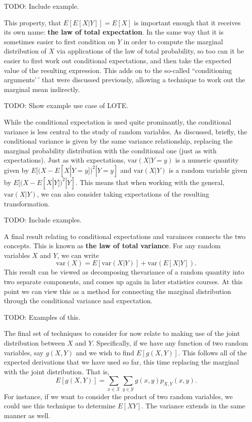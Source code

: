 \documentclass[
  letterpaper,
  DIV=11,
  numbers=noendperiod]{scrreprt}
\begin{document}
TODO: Include example.

This property, that \(E[E[X|Y]] = E[X]\) is important enough that it
receives its own name: \textbf{the law of total expectation}. In the
same way that it is sometimes easier to first condition on \(Y\) in
order to compute the marginal distribution of \(X\) via applications of
the law of total probability, so too can it be easier to first work out
conditional expectations, and then take the expected value of the
resulting expression. This adds on to the so-called ``conditioning
arguments'\,' that were discussed previously, allowing a technique to
work out the marginal mean indirectly.

TODO: Show example use case of LOTE.

While the conditional expectation is used quite prominantly, the
conditional variance is less central to the study of random variables.
As discussed, briefly, the conditional variance is given by the same
variance relationship, replacing the marginal probability distribution
with the conditional one (just as with expectations). Just as with
expectations, \(\text{var}(X|Y=y)\) is a numeric quantity given by
\(E[(X-E[X|Y=y])^2|Y=y]\) and \(\text{var}(X|Y)\) is a random variable
given by \(E[(X-E[X|Y])^2|Y]\). This means that when working with the
general, \(\text{var}(X|Y)\), we can also consider taking expectations
of the resulting transformation.

TODO: Include examples.

A final result relating to conditional expectations and varainces
connects the two concepts. This is known as \textbf{the law of total
variance}. For any random variables \(X\) and \(Y\), we can write
\[\text{var}(X) = E[\text{var}(X|Y)] + \text{var}(E[X|Y]).\] This result
can be viewed as decomposing thevariance of a random quantity into two
separate components, and comes up again in later statistics courses. At
this point we can view this as a method for connecting the marginal
distribution through the conditional variance nad expectation.

TODO: Examples of this.

The final set of techniques to consider for now relate to making use of
the joint distribution between \(X\) and \(Y\). Specifically, if we have
any function of two random variables, say \(g(X,Y)\) and we wish to find
\(E[g(X,Y)]\). This follows all of the expected derivations that we have
used so far, this time replacing the marginal with the joint
distribution. That is,
\[E[g(X,Y)] = \sum_{x\in\mathcal{X}}\sum_{y\in\mathcal{Y}}g(x,y)p_{X,Y}(x,y).\]
For instance, if we want to consider the product of two random
variables, we could use this technique to determine \(E[XY]\). The
variance extends in the same manner as well.
\end{document}
